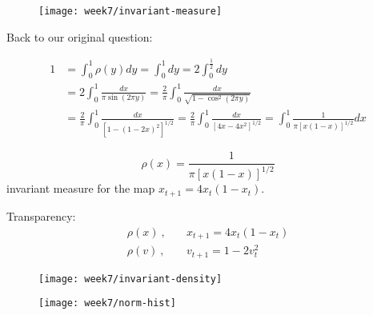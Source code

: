 \begin{figure}[h]
    \centering
    \texttt{[image: week7/invariant-measure]}\\
    \caption{}
    \label{fig:invariant-measure}
\end{figure}

Back to our original question:

\begin{align}
1 &= \int_0^1\rho(y) dy = \int_0^1dy=2\int_0^\frac{1}{2}dy\\
&= 2\int_0^1\frac{dx}{\pi\sin(2\pi y)} = \frac{2}{\pi}\int_0^1\frac{dx}{\sqrt{1-\cos^2(2\pi y)}}\\
&= \frac{2}{\pi}\int_0^1\frac{dx}{[1-(1-2x)^2]^{1/2}} = \frac{2}{\pi}\int_0^1\frac{dx}{[4x-4x^2]^{1/2}} = \int_0^1\frac{1}{\pi[x(1-x)]^{1/2}}dx
\end{align}

\begin{equation}
\rho(x) = \frac{1}{\pi[x(1-x)]^{1/2}}
\end{equation}
invariant measure for the map $x_{t+1} = 4x_t(1-x_t)$.

Transparency:
\begin{align}
\rho(x)\ ,&\quad x_{t+1}=4x_t(1-x_t)\\
\rho(v)\ ,&\quad v_{t+1}=1-2v_t^2
\end{align}

\begin{figure}[h]
    \centering
    \texttt{[image: week7/invariant-density]}\\
    \caption{}
    \label{fig:invariant-density}
\end{figure}
\begin{figure}[h]
    \centering
    \texttt{[image: week7/norm-hist]}\\
    \caption{}
    \label{fig:norm-hist}
\end{figure}